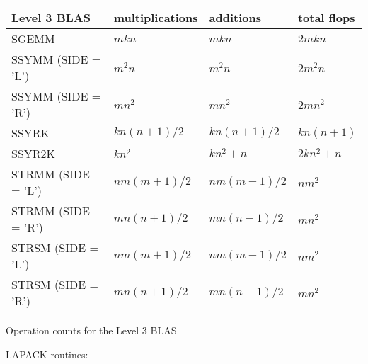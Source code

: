 \vfill
\noindent
\TS
\begin{tabular}{| l | l | l | l |} \hline
Level 3 BLAS       & multiplications      & additions      & total flops \\ \hline\hline
SGEMM              & $ m k n $  & $ m k n $ & $ 2 m k n $ \\ \hline
SSYMM (SIDE = 'L') & $ m^2 n $  & $ m^2 n $ & $ 2 m^2 n $ \\
SSYMM (SIDE = 'R') & $ m n^2 $  & $ m n^2 $ & $ 2 m n^2 $ \\ \hline
SSYRK              & $ k n (n+1)/2 $ & $ k n (n+1)/2 $ & $ k n (n+1) $ \\ \hline
SSYR2K             & $ k n^2 $ & $ k n^2 + n $ & $ 2 k n^2 + n $ \\ \hline
STRMM (SIDE = 'L') & $ n m (m+1)/2 $ & $ n m (m-1)/2 $ & $ n m^2 $ \\
STRMM (SIDE = 'R') & $ m n (n+1)/2 $ & $ m n (n-1)/2 $ & $ m n^2 $ \\ \hline
STRSM (SIDE = 'L') & $ n m (m+1)/2 $ & $ n m (m-1)/2 $ & $ n m^2 $ \\
STRSM (SIDE = 'R') & $ m n (n+1)/2 $ & $ m n (n-1)/2 $ & $ m n^2 $ \\ \hline
\end{tabular}
\caption{Operation counts for the Level 3 BLAS}
\label{opcount-BLAS3}
\TE

\pagebreak
\noindent
LAPACK routines:

